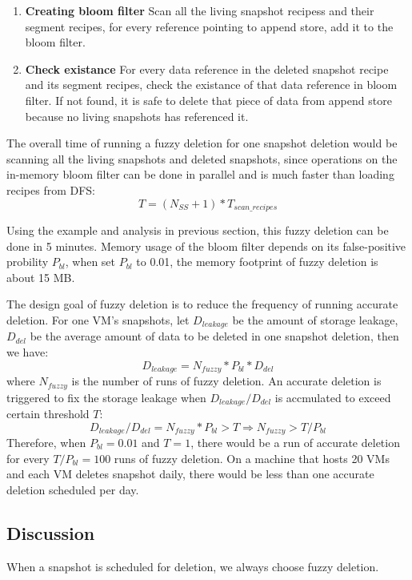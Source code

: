 \begin{enumerate}
\item {\bf Creating bloom filter} Scan all the living snapshot recipess and their segment recipes,
for every reference pointing to append store, add it to the bloom filter.
\item {\bf Check existance} For every data reference in the deleted snapshot recipe and its segment recipes,
check the existance of that data reference in bloom filter. If not found, it is safe to delete that piece of data from append store
because no living snapshots has referenced it.
\end{enumerate}

The overall time of running a fuzzy deletion for one snapshot deletion would be scanning
all the living snapshots and deleted snapshots, since operations on the in-memory bloom filter can be done in
parallel and is much faster than loading recipes from DFS:
\begin{equation}
T = (N_{SS} + 1) * T_{scan\_recipes}
\end{equation}
 
Using the example and analysis in previous section, this fuzzy deletion can be done in 5 minutes. 
Memory usage of the bloom filter depends on its false-positive probility $P_{bl}$,
when set $P_{bl}$ to 0.01, the memory footprint of fuzzy deletion is about 15 MB.

The design goal of fuzzy deletion is to reduce the frequency of running accurate deletion.
For one VM's snapshots, let $D_{leakage}$ be the amount of storage leakage, $D_{del}$ be the average amount of data
to be deleted in one snapshot deletion, 
then we have:
\begin{equation}
D_{leakage} = N_{fuzzy} * P_{bl} * D_{del}
\end{equation}
where $N_{fuzzy}$ is the number of runs of fuzzy deletion. 
An accurate deletion is triggered to fix the storage leakage
when $D_{leakage}/D_{del}$ is accmulated to exceed certain threshold $T$:
\begin{equation}
D_{leakage} / D_{del} = N_{fuzzy} * P_{bl} > T \Rightarrow N_{fuzzy} > T/P_{bl}
\end{equation}
Therefore, when $P_{bl} = 0.01$ and $T=1$, 
there would be a run of accurate deletion for every $T/P_{bl} = 100$ runs of fuzzy deletion.
On a machine that hosts 20 VMs and each VM deletes snapshot daily, there would be less than
one accurate deletion scheduled per day.

\subsection{Discussion}
When a snapshot is scheduled for deletion, we always choose fuzzy deletion.
